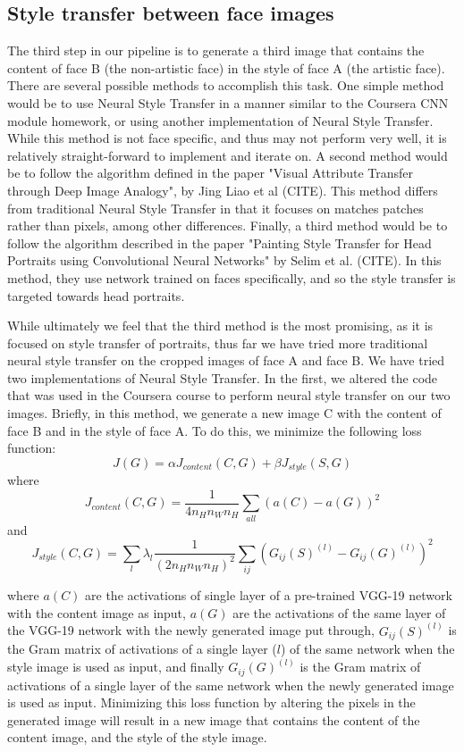 \documentclass{pnastwo2}
\begin{document}
\begin{article}
\subsection{Style transfer between face images}

The third step in our pipeline is to generate a third image that contains the content of face B (the non-artistic face) in the style of face A (the artistic face). There are several possible methods to accomplish this task. One simple method would be to use Neural Style Transfer in a manner similar to the Coursera CNN module homework, or using another implementation of Neural Style Transfer. While this method is not face specific, and thus may not perform very well, it is relatively straight-forward to implement and iterate on. A second method would be to follow the algorithm defined in the paper "Visual Attribute Transfer through Deep Image Analogy", by Jing Liao et al (CITE). This method differs from traditional Neural Style Transfer in that it focuses on matches patches rather than pixels, among other differences. Finally, a third method would be to follow the algorithm described in the paper "Painting Style Transfer for Head Portraits using Convolutional Neural Networks" by Selim et al. (CITE). In this method, they use network trained on faces specifically, and so the style transfer is targeted towards head portraits.

While ultimately we feel that the third method is the most promising, as it is focused on style transfer of portraits, thus far we have tried more traditional neural style transfer on the cropped images of face A and face B. We have tried two implementations of Neural Style Transfer. In the first, we altered the code that was used in the Coursera course to perform neural style transfer on our two images. Briefly, in this method, we generate a new image C with the content of face B and in the style of face A. To do this, we minimize the following loss function:
\[
J(G)=\alpha J_{content}(C,G)+\beta J_{style}(S,G)
\]
where
\[
 J_{content}(C,G) = \frac{1}{4n_Hn_Wn_H} \sum_{all} (a(C) - a(G))^2
\]
and 
\[
 J_{style}(C,G) = \sum_l  \lambda_l \frac{1}{(2n_Hn_Wn_H)^2} \sum_{ij} (G_{ij}(S)^{(l)} - G_{ij}(G)^{(l)})^2
\]

where $a(C)$ are the activations of single layer of a pre-trained VGG-19 network with the content image as input, $a(G)$ are the activations of the same layer of the VGG-19 network with the newly generated image put through, $G_{ij}(S)^{(l)}$ is the Gram matrix of activations of a single layer ($l$) of the same network when the style image is used as input, and finally $G_{ij}(G)^{(l)}$ is the Gram matrix of activations of a single layer of the same network when the newly generated image is used as input. Minimizing this loss function by altering the pixels in the generated image will result in a new image that contains the content of the content image, and the style of the style image. 


\end{article}
\end{document}
